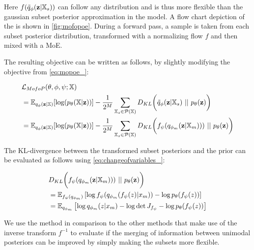 Here $f(\tilde{q}_{\phi}(\textbf{z}|\mathbb{X}_s))$ can follow any distribution and is thus more flexible than the gaussian subset posterior approximation in the  model.
A flow chart depiction of the  is shown in \cref{fig:mofopoe}.
During a forward pass, a sample is taken from each subset posterior distribution, transformed with a normalizing flow $f$ and then mixed with a MoE.

The resulting objective can be written as follows, by slightly modifying the  objective from \cref{eq:mopoe_}:

\begin{equation}
    \begin{split}
        &\mathcal{L}_{\mg{MofoP}}(\theta, \phi, \psi; \xset)\\
        &=  \mathbb{E}_{q_{\phi}(\textbf{z}|\mathbb{X})}[\log (p_{\theta}(\mathbb{X}|\textbf{z}))] - \frac{1}{2^M} \sum _{\mathbb{X}_s \in \mathcal{P}(\mathbb{X})} D_{KL}\biggl( \tilde{q}_{\phi}(\textbf{z}|\mathbb{X}_s)\ ||\ p_{\theta}(\textbf{z})\biggr)\\
        &= \mathbb{E}_{q_{\phi}(\textbf{z}|\mathbb{X})}[\log (p_{\theta}(\mathbb{X}|\textbf{z}))] - \frac{1}{2^M} \sum _{\mathbb{X}_s \in \mathcal{P}(\mathbb{X})} D_{KL}\biggl( f_{\psi} (\unimodalpost))\ ||\ p_{\theta}(\textbf{z})\biggr)
    \end{split}
\end{equation}

The KL-divergence between the transformed subset posteriors and the prior can be evaluated as follows using \cref{eq:changeofvariables_}:

\begin{equation}
    \begin{split}
        &D_{KL}\biggl( f_{\psi} (\unimodalpost))\ ||\ p_{\theta}(\textbf{z})\biggr)\\
        &= \mathbb{E}_{f_{\psi}(q_{\phi_m})} \left[ \log  f_{\psi} (q_{\phi_m}(f_{\psi}(z)|x_m)) - \log p_{\theta}(f_{\psi}(z))   \right]\\
        &= \mathbb{E}_{q_{\phi_m}} \left[ \log  q_{\phi_m}(z|x_m) - \log \det J_{f_{\psi}} - \log p_{\theta}(f_{\psi}(z))   \right]\\
    \end{split}
\end{equation}

We use the  method in comparison to the other methods that make use of the inverse transform $f^{-1}$ to evaluate if the merging of information between unimodal posteriors can be improved by simply making the subsets more flexible.

